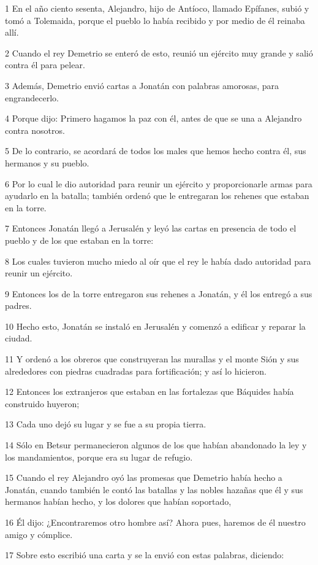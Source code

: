 \par 1 En el año ciento sesenta, Alejandro, hijo de Antíoco, llamado Epífanes, subió y tomó a Tolemaida, porque el pueblo lo había recibido y por medio de él reinaba allí.
\par 2 Cuando el rey Demetrio se enteró de esto, reunió un ejército muy grande y salió contra él para pelear.
\par 3 Además, Demetrio envió cartas a Jonatán con palabras amorosas, para engrandecerlo.
\par 4 Porque dijo: Primero hagamos la paz con él, antes de que se una a Alejandro contra nosotros.
\par 5 De lo contrario, se acordará de todos los males que hemos hecho contra él, sus hermanos y su pueblo.
\par 6 Por lo cual le dio autoridad para reunir un ejército y proporcionarle armas para ayudarlo en la batalla; también ordenó que le entregaran los rehenes que estaban en la torre.
\par 7 Entonces Jonatán llegó a Jerusalén y leyó las cartas en presencia de todo el pueblo y de los que estaban en la torre:
\par 8 Los cuales tuvieron mucho miedo al oír que el rey le había dado autoridad para reunir un ejército.
\par 9 Entonces los de la torre entregaron sus rehenes a Jonatán, y él los entregó a sus padres.
\par 10 Hecho esto, Jonatán se instaló en Jerusalén y comenzó a edificar y reparar la ciudad.
\par 11 Y ordenó a los obreros que construyeran las murallas y el monte Sión y sus alrededores con piedras cuadradas para fortificación; y así lo hicieron.
\par 12 Entonces los extranjeros que estaban en las fortalezas que Báquides había construido huyeron;
\par 13 Cada uno dejó su lugar y se fue a su propia tierra.
\par 14 Sólo en Betsur permanecieron algunos de los que habían abandonado la ley y los mandamientos, porque era su lugar de refugio.
\par 15 Cuando el rey Alejandro oyó las promesas que Demetrio había hecho a Jonatán, cuando también le contó las batallas y las nobles hazañas que él y sus hermanos habían hecho, y los dolores que habían soportado,
\par 16 Él dijo: ¿Encontraremos otro hombre así? Ahora pues, haremos de él nuestro amigo y cómplice.
\par 17 Sobre esto escribió una carta y se la envió con estas palabras, diciendo:
